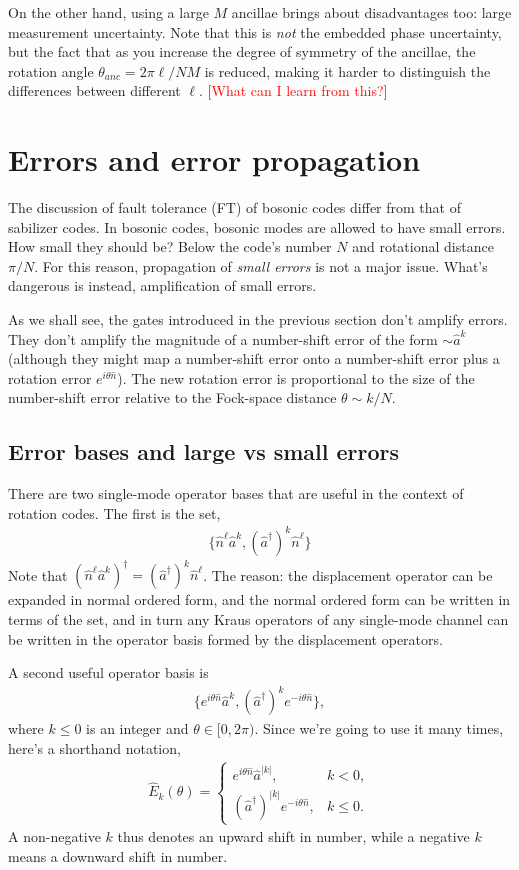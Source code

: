 \documentclass{article}
\begin{document}
On the other hand, using a large $M$ ancillae brings about disadvantages too: large measurement uncertainty. Note that this is \textit{not} the embedded phase uncertainty, but the fact that as you increase the degree of symmetry of the ancillae, the rotation angle $\theta_{anc}=2\pi\ell/NM$ is reduced, making it harder to distinguish the differences between different $\ell$. [\textcolor{red}{What can I learn from this?}]
\section{Errors and error propagation}
The discussion of fault tolerance (FT) of bosonic codes differ from that of sabilizer codes. In bosonic codes, bosonic modes are allowed to have small errors. How small they should be? Below the code's number $N$ and rotational distance $\pi/N$. For this reason, propagation of \textit{small errors} is not a major issue. What's dangerous is instead, amplification of small errors.

As we shall see, the gates introduced in the previous section don't amplify errors. They don't amplify the magnitude of a number-shift error of the form $\sim\hat{a}^k$ (although they might map a number-shift error onto a number-shift error plus a rotation error $e^{i\theta\hat{n}}$). The new rotation error is proportional to the size of the number-shift error relative to the Fock-space distance $\theta\sim k/N$. 
\subsection{Error bases and large vs small errors}
There are two single-mode operator bases that are useful in the context of rotation codes. The first is the set,
\begin{align}
    \{\hat{n}^{\ell}\hat{a}^{k}, (\hat{a}^\dagger)^k\hat{n}^\ell\}
\end{align}
Note that $(\hat{n}^{\ell}\hat{a}^{k})^\dagger = (\hat{a}^\dagger)^k\hat{n}^\ell$. The reason: the displacement operator can be expanded in normal ordered form, and the normal ordered form can be written in terms of the set, and in turn any Kraus operators of any single-mode channel can be written in the operator basis formed by the displacement operators. 

A second useful operator basis is 
\begin{align}
    \{e^{i\theta\hat{n}}\hat{a}^k, (\hat{a}^\dagger)^k e^{-i\theta\hat{n}}\},
\end{align}
where $k\leq 0$ is an integer and $\theta\in [0, 2\pi)$. Since we're going to use it many times, here's a shorthand notation,
\begin{align}
    \hat{E}_k(\theta)=\begin{cases}
        e^{i\theta\hat{n}}\hat{a}^{|k|},& k < 0,\\
        (\hat{a}^\dagger)^{|k|}e^{-i\theta\hat{n}}, &k\leq 0.
    \end{cases}
\end{align}
A non-negative $k$ thus denotes an upward shift in number, while a negative $k$ means a downward shift in number.
\end{document}

